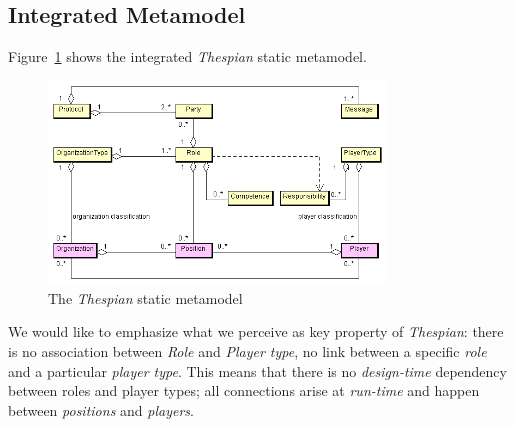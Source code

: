 \subsection{Integrated Metamodel}

Figure~\ref{figure:thespian-integrated-metamodel} shows the integrated \textit{Thespian} static metamodel.

\begin{figure}[ht]
	\centering
	\includegraphics[width=0.8\textwidth]{images/thespian/thespian-metamodel.png}
	\caption{The \textit{Thespian} static metamodel}
	\label{figure:thespian-integrated-metamodel}
\end{figure}

We would like to emphasize what we perceive as key property of \textit{Thespian}: there is no association between \textit{Role} and \textit{Player type}, no link between a specific \textit{role} and a particular \textit{player type}.
This means that there is no \textit{design-time} dependency between roles and player types; all connections arise at \textit{run-time} and happen between \textit{positions} and \textit{players}.